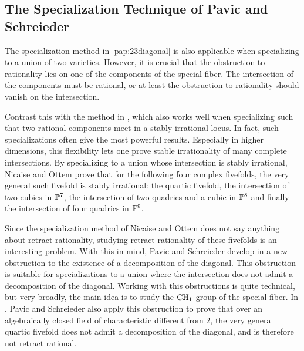 \subsection{The Specialization Technique of Pavic and Schreieder}
The specialization method in \cref{pap:23diagonal} is also applicable when specializing to a union of two varieties. However, it is crucial that the obstruction to rationality lies on one of the components of the special fiber. The intersection of the components must be rational, or at least the obstruction to rationality should vanish on the intersection.

Contrast this with the method in \cite{NicaiseOttem}, which also works well when specializing such that two rational components meet in a stably irrational locus. In fact, such specializations often give the most powerful results. Especially in higher dimensions, this flexibility lets one prove stable irrationality of many complete intersections. By specializing to a union whose intersection is stably irrational, Nicaise and Ottem prove that for the following four complex fivefolds, the very general such fivefold is stably irrational: the quartic fivefold, the intersection of two cubics in $\P^7$, the intersection of two quadrics and a cubic in $\P^8$ and finally the intersection of four quadrics in $\P^9$.

Since the specialization method of Nicaise and Ottem does not say anything about retract rationality, studying retract rationality of these fivefolds is an interesting problem. With this in mind, Pavic and Schreieder develop in \cite{PavicSchreieder} a new obstruction to the existence of a decomposition of the diagonal. This obstruction is suitable for specializations to a union where the intersection does not admit a decomposition of the diagonal. Working with this obstructions is quite technical, but very broadly, the main idea is to study the $\CH_1$ group of the special fiber.
In \cite{PavicSchreieder}, Pavic and Schreieder also apply this obstruction to prove that over an algebraically closed field of characteristic different from $2$, the very general quartic fivefold does not admit a decomposition of the diagonal, and is therefore not retract rational.

